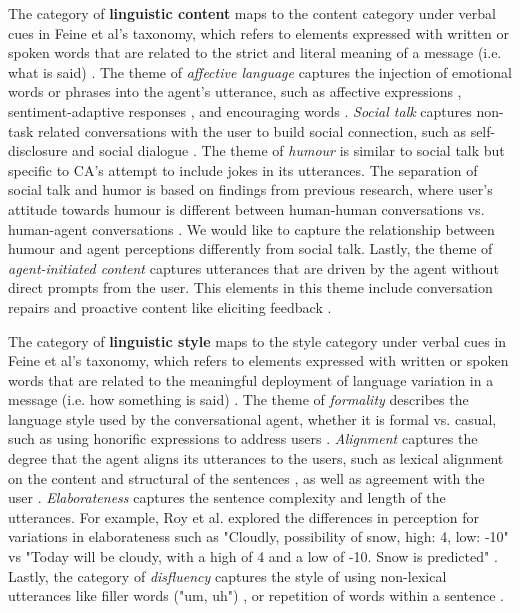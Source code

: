 \documentclass[sigconf,screen,review, anonymous]{acmart}
\newcommand{\cmt}[1]{}%
\begin{document}
The category of \textbf{linguistic content} maps to the content category under verbal cues in Feine et al's taxonomy, which refers to elements expressed with written or spoken words that are related to the strict and literal meaning of a message (i.e. what is said) \cite{feine2019taxonomy}. The theme of \textit{affective language} captures the injection of emotional words or phrases into the agent's utterance, such as affective expressions \cite{seeger2021chatbots}\cmt{[35]}\cite{yang2017perceived}\cmt{[44]}\cite{zhu2022effects}\cmt{[26]}, sentiment-adaptive responses \cite{diederich2019emulating}\cmt{[25]}, and encouraging words \cite{healey2013relating}\cmt{[39]}. \textit{Social talk} captures non-task related conversations with the user to build social connection, such as self-disclosure \cite{lee2020hear}\cmt{[23]} and social dialogue \cite{volkel2021manipulating}\cmt{[68]}\cite{lubold2016effects}\cmt{[86]}. The theme of \textit{humour} is similar to social talk but specific to CA's attempt to include jokes in its utterances. The separation of social talk and humor is based on findings from previous research, where user's attitude towards humour is different between human-human conversations vs. human-agent conversations \cite{clark2019makes}. We would like to capture the relationship between humour and agent perceptions differently from social talk. Lastly, the theme of \textit{agent-initiated content} captures utterances that are driven by the agent without direct prompts from the user. This elements in this theme include conversation repairs \cite{cuadra2021my}\cmt{[67]}\cite{ashktorab2019resilient}\cmt{[88]} and proactive content like eliciting feedback \cite{xiao2021let}\cmt{[73]}.

The category of \textbf{linguistic style} maps to the style category under verbal cues in Feine et al's taxonomy, which refers to elements expressed with written or spoken words that are related to the meaningful deployment of language variation in a message (i.e. how something is said) \cite{feine2019taxonomy}. The theme of \textit{formality} describes the language style used by the conversational agent, whether it is formal vs. casual, such as using honorific expressions to address users \cite{ouchi2019should}\cmt{[59]}. \textit{Alignment} captures the degree that the agent aligns its utterances to the users, such as lexical alignment on the content and structural of the sentences \cite{huiyang2022improving}\cmt{[17]}\cite{linnemann2018can}\cmt{[15]}, as well as agreement with the user \cite{volkel2021examining}\cmt{[69]}. \textit{Elaborateness} captures the sentence complexity and length of the utterances. For example, Roy et al. explored the differences in perception for variations in elaborateness such as "Cloudly, possibility of snow, high: 4, low: -10" vs "Today will be cloudy, with a high of 4 and a low of -10. Snow is predicted" \cite{roy2021users}\cmt{[71]}. Lastly, the category of \textit{disfluency} captures the style of using non-lexical utterances like filler words ("um, uh") \cite{hu2021enhancing}\cmt{[56]}\cite{jeong2019exploring}\cmt{[10]}, or repetition of words within a sentence \cite{yang2021effect}\cmt{[72]}. 
\end{document}
